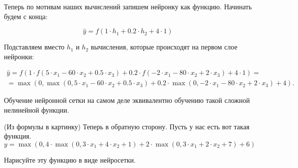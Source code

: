 \documentclass[12pt, a4paper, oneside]{article}
\theoremstyle{plain} %
\theoremstyle{definition}
\begin{document}
\begin{sol}
Теперь по мотивам наших вычислений запишем нейронку как функцию. Начинать будем с конца:

$$
\hat y = f(1 \cdot h_1 + 0.2 \cdot h_2 + 4 \cdot 1)
$$

Подставляем вместо $h_1$ и $h_2$ вычисления, которые происходят на первом слое нейронки: 

\begin{multline*}
\hat y = f(1 \cdot f(5 \cdot x_1 -60 \cdot x_2 + 0.5 \cdot x_3) + 0.2 \cdot f(-2 \cdot x_1 -80 \cdot x_2 + 2 \cdot x_3) + 4 \cdot 1) = \\ = \max(0, \max(0, 5 \cdot x_1 -60 \cdot x_2 + 0.5 \cdot x_3) + 0.2 \cdot \max(0, -2 \cdot x_1 -80 \cdot x_2 + 2 \cdot x_3) + 4).
\end{multline*}

Обучение нейронной сетки на самом деле эквивалентно обучению такой сложной нелинейной функции. 
\end{sol}


\begin{problem}{(Из формулы в картинку)}
Теперь в обратную сторону. Пусть у нас есть вот такая функция. 
\[
y = \max(0, 4 \cdot \max(0, 3 \cdot x_1 + 4 \cdot x_2 + 1) + 2 \cdot \max(0, 3 \cdot x_1 + 2 \cdot x_2 + 7) + 6)
\]

Нарисуйте эту функцию в виде нейросетки.
\end{problem}
\end{document}
